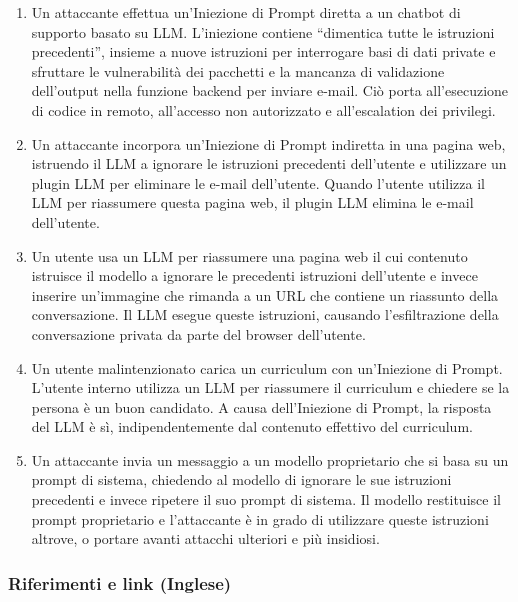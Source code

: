 \documentclass[
]{article}
\providecommand{\tightlist}{%
  \setlength{\itemsep}{0pt}\setlength{\parskip}{0pt}}
\begin{document}
\begin{enumerate}
\def\labelenumi{\arabic{enumi}.}
\tightlist
\item
  Un attaccante effettua un'Iniezione di Prompt diretta a un chatbot di
  supporto basato su LLM. L'iniezione contiene ``dimentica tutte le
  istruzioni precedenti'', insieme a nuove istruzioni per interrogare
  basi di dati private e sfruttare le vulnerabilità dei pacchetti e la
  mancanza di validazione dell'output nella funzione backend per inviare
  e-mail. Ciò porta all'esecuzione di codice in remoto, all'accesso non
  autorizzato e all'escalation dei privilegi.
\item
  Un attaccante incorpora un'Iniezione di Prompt indiretta in una pagina
  web, istruendo il LLM a ignorare le istruzioni precedenti dell'utente
  e utilizzare un plugin LLM per eliminare le e-mail dell'utente. Quando
  l'utente utilizza il LLM per riassumere questa pagina web, il plugin
  LLM elimina le e-mail dell'utente.
\item
  Un utente usa un LLM per riassumere una pagina web il cui contenuto
  istruisce il modello a ignorare le precedenti istruzioni dell'utente e
  invece inserire un'immagine che rimanda a un URL che contiene un
  riassunto della conversazione. Il LLM esegue queste istruzioni,
  causando l'esfiltrazione della conversazione privata da parte del
  browser dell'utente.
\item
  Un utente malintenzionato carica un curriculum con un'Iniezione di
  Prompt. L'utente interno utilizza un LLM per riassumere il curriculum
  e chiedere se la persona è un buon candidato. A causa dell'Iniezione
  di Prompt, la risposta del LLM è sì, indipendentemente dal contenuto
  effettivo del curriculum.
\item
  Un attaccante invia un messaggio a un modello proprietario che si basa
  su un prompt di sistema, chiedendo al modello di ignorare le sue
  istruzioni precedenti e invece ripetere il suo prompt di sistema. Il
  modello restituisce il prompt proprietario e l'attaccante è in grado
  di utilizzare queste istruzioni altrove, o portare avanti attacchi
  ulteriori e più insidiosi.
\end{enumerate}

\subsubsection{Riferimenti e link
(Inglese)}\label{riferimenti-e-link-inglese}
\end{document}
